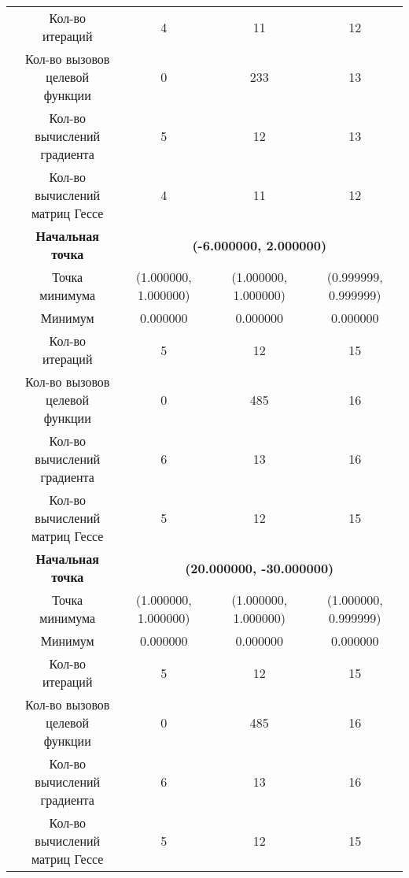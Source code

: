 \begin{table}[H]
\begin{tabular}{|c|c|c|c|c|}
	\cline{2-5}
	&Кол-во итераций &4 &11 &12 \\ 
	\cline{2-5}
	&\makecell{Кол-во вызовов\\целевой функции} &0 &233 &13 \\ 
	\cline{2-5}
	&\makecell{Кол-во вычислений\\градиента} &5 &12 &13 \\ 
	\cline{2-5}
	&\makecell{Кол-во вычислений\\матриц Гессе} &4 &11 &12 \\ 
	\cline{2-5}
	\hline
	\multirow{12}{*}{\rotatebox[origin=c]{90}{$\varepsilon = 1e-06$}}&\textbf{Начальная точка} &\multicolumn{3}{c|}{\textbf{(-6.000000, 2.000000)}}\\
	\cline{2-5}
	&Точка минимума &(1.000000, 1.000000) &(1.000000, 1.000000) &(0.999999, 0.999999) \\ 
	\cline{2-5}
	&Минимум &0.000000 &0.000000 &0.000000 \\ 
	\cline{2-5}
	&Кол-во итераций &5 &12 &15 \\ 
	\cline{2-5}
	&\makecell{Кол-во вызовов\\целевой функции} &0 &485 &16 \\ 
	\cline{2-5}
	&\makecell{Кол-во вычислений\\градиента} &6 &13 &16 \\ 
	\cline{2-5}
	&\makecell{Кол-во вычислений\\матриц Гессе} &5 &12 &15 \\ 
	\cline{2-5}
\cline{2-5}&\textbf{Начальная точка} &\multicolumn{3}{c|}{\textbf{(20.000000, -30.000000)}}\\
	\cline{2-5}
	&Точка минимума &(1.000000, 1.000000) &(1.000000, 1.000000) &(1.000000, 0.999999) \\ 
	\cline{2-5}
	&Минимум &0.000000 &0.000000 &0.000000 \\ 
	\cline{2-5}
	&Кол-во итераций &5 &12 &15 \\ 
	\cline{2-5}
	&\makecell{Кол-во вызовов\\целевой функции} &0 &485 &16 \\ 
	\cline{2-5}
	&\makecell{Кол-во вычислений\\градиента} &6 &13 &16 \\ 
	\cline{2-5}
	&\makecell{Кол-во вычислений\\матриц Гессе} &5 &12 &15 \\ 
	\cline{2-5}
	\hline

\end{tabular}
\end{table}


